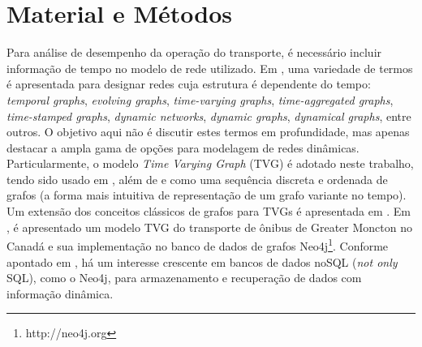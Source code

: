 
\chapter{Material e Métodos}\label{cap:materialemetodos}




Para análise de desempenho da operação do transporte, é necessário incluir informação de tempo no modelo de rede utilizado. Em \cite{hol:12}, uma variedade de termos é apresentada para designar redes cuja estrutura é dependente do tempo: \emph{temporal graphs}, \emph{evolving graphs}, \emph{time-varying graphs}, \emph{time-aggregated graphs}, \emph{time-stamped graphs}, \emph{dynamic networks}, \emph{dynamic graphs}, \emph{dynamical graphs}, entre outros. O objetivo aqui não é discutir estes termos em profundidade, mas apenas destacar a ampla gama de opções para modelagem de redes dinâmicas. Particularmente, o modelo \emph{Time Varying Graph} (TVG) é adotado neste trabalho, tendo sido usado em \cite{sant:09}, além de \cite{tang:10} e \cite{lat:10} como uma sequência discreta e ordenada de grafos (a forma mais intuitiva de representação de um grafo variante no tempo). Um extensão dos conceitos clássicos de grafos para TVGs é apresentada em \cite{lat:12}. Em \cite{wach:19}, é apresentado um modelo TVG do transporte de ônibus de Greater Moncton no Canadá e sua implementação no banco de dados de grafos Neo4j\footnote{http://neo4j.org}. Conforme apontado em \cite{vick:10}, há um interesse crescente em bancos de dados noSQL (\emph{not only} SQL), como o Neo4j, para armazenamento e recuperação de dados com informação dinâmica.


